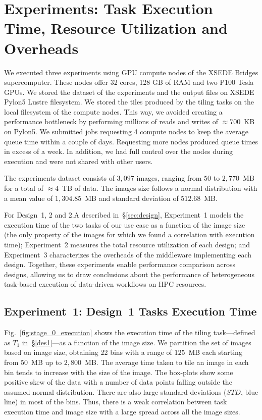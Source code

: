 \section{Experiments: Task Execution Time, Resource Utilization and Overheads}\label{sec:des_experiments}
We executed three experiments using GPU compute nodes of the XSEDE Bridges supercomputer.
These nodes offer 32 cores, 128 GB of RAM and two P100 Tesla GPUs.
We stored the dataset of the experiments and the output files on XSEDE Pylon5 Lustre filesystem.
We stored the tiles produced by the tiling tasks on the local filesystem of the compute nodes.
This way, we avoided creating a performance bottleneck by performing millions of reads and writes of $\approx700$~KB on Pylon5.
We submitted jobs requesting 4 compute nodes to keep the average queue time within a couple of days.
Requesting more nodes produced queue times in excess of a week.
In addition, we had full control over the nodes during execution and were not shared with other users.

The experiments dataset consists of $3,097$ images, ranging from $50$ to $2,770$~MB for a total of $\approx4$~TB of data.
The images size follows a normal distribution with a mean value of $1,304.85$~MB and standard deviation of $512.68$~MB.

For Design~1, 2 and 2.A described in~\S\ref{sec:design}, Experiment~1 models the execution time of the two tasks of our use case as a function of the image size (the only property of the images for which we found a correlation with execution time); Experiment~2 measures the total resource utilization of each design; and Experiment~3 characterizes the overheads of the middleware implementing each design.
Together, these experiments enable performance comparison across designs, allowing us to draw conclusions about the performance of heterogeneous task-based execution of data-driven workflows on HPC resources.

\subsection{Experiment~1: Design~1 Tasks Execution Time}
\label{ssec:des1analysis}

Fig.~\ref{fig:stage_0_execution} shows the execution time of the tiling task---defined as $T_{1}$ in~\S\ref{des1}---as a function of the image size.
We partition the set of images based on image size, obtaining 22 bins with a range of $125$~MB each starting from $50$~MB up to $2,800$~MB.
The average time taken to tile an image in each bin tends to increase with the size of the image.
The box-plots show some positive skew of the data with a number of data points  falling outside the assumed normal distribution.
There are also large standard deviations ($STD$, blue line) in most of the bins.
Thus, there is a weak correlation between task execution time and image size with a large spread  across all the image sizes.

